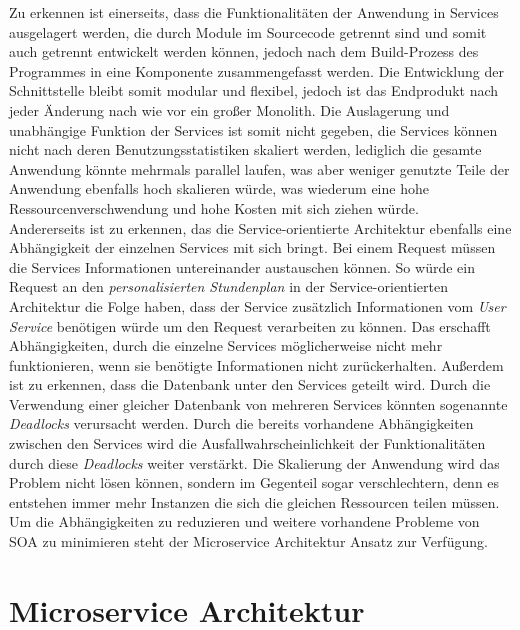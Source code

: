 Zu erkennen ist einerseits, dass die Funktionalitäten der Anwendung in Services ausgelagert werden, die durch Module im Sourcecode getrennt sind und somit auch getrennt entwickelt werden können, jedoch nach dem Build-Prozess des Programmes in eine Komponente zusammengefasst werden. Die Entwicklung der Schnittstelle bleibt somit modular und flexibel, jedoch ist das Endprodukt nach jeder Änderung nach wie vor ein großer Monolith. Die Auslagerung und unabhängige Funktion der Services ist somit nicht gegeben, die Services können nicht nach deren Benutzungsstatistiken skaliert werden, lediglich die gesamte Anwendung könnte mehrmals parallel laufen, was aber weniger genutzte Teile der Anwendung ebenfalls hoch skalieren würde, was wiederum eine hohe Ressourcenverschwendung und hohe Kosten mit sich ziehen würde.
\\
\linebreak
Andererseits ist zu erkennen, das die Service-orientierte Architektur ebenfalls eine Abhängigkeit der einzelnen Services mit sich bringt. Bei einem Request müssen die Services Informationen untereinander austauschen können. So würde ein Request an den \textit{personalisierten Stundenplan} in der Service-orientierten Architektur die Folge haben, dass der Service zusätzlich Informationen vom \textit{User Service} benötigen würde um den Request verarbeiten zu können. Das erschafft Abhängigkeiten, durch die einzelne Services möglicherweise nicht mehr funktionieren, wenn sie benötigte Informationen nicht zurückerhalten. Außerdem ist zu erkennen, dass die Datenbank unter den Services geteilt wird. Durch die Verwendung einer gleicher Datenbank von mehreren Services könnten sogenannte \textit{Deadlocks} verursacht werden. Durch die bereits vorhandene Abhängigkeiten zwischen den Services wird die Ausfallwahrscheinlichkeit der Funktionalitäten durch diese \textit{Deadlocks} weiter verstärkt. Die Skalierung der Anwendung wird das Problem nicht lösen können, sondern im Gegenteil sogar verschlechtern, denn es entstehen immer mehr Instanzen die sich die gleichen Ressourcen teilen müssen.
\\
\linebreak
Um die Abhängigkeiten zu reduzieren und weitere vorhandene Probleme von \ac{SOA} zu minimieren steht der Microservice Architektur Ansatz zur Verfügung.

\section{Microservice Architektur}

